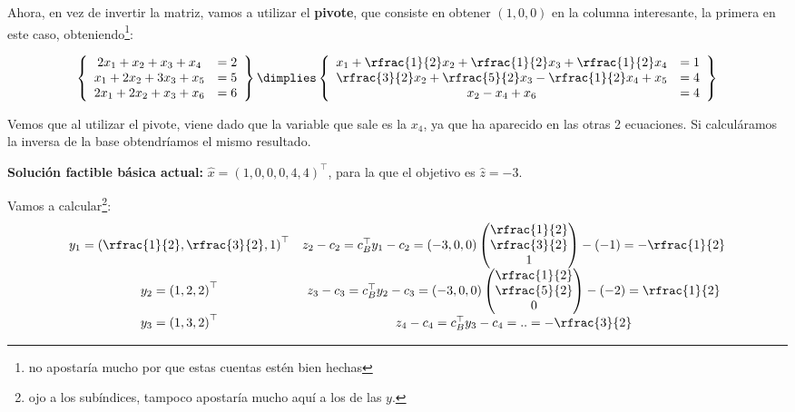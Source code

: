 \begin{example}
Ahora, en vez de invertir la matriz, vamos a utilizar el \textbf{pivote}, que consiste en obtener $(1,0,0)$ en la columna interesante, la primera en este caso, obteniendo\footnote{no apostaría mucho por que estas cuentas estén bien hechas}:

\[
\left\{
\begin{array}{cc}
2x_1+x_2+x_3 + x_4 &= 2   \\
x_1 + 2x_2 + 3x_3 +  x_5 &= 5  \\
2x_1+2x_2+x_3 + x_6 &= 6
\end{array}
\right\}
\dimplies
\left\{
\begin{array}{cc}
\displaystyle x_1+\rfrac{1}{2}x_2+\rfrac{1}{2}x_3 + \rfrac{1}{2}x_4 &= 1   \\
\displaystyle \rfrac{3}{2}x_2 + \rfrac{5}{2}x_3 - \rfrac{1}{2} x_4 + x_5 &= 4  \\
\displaystyle x_2 -x_4 + x_6 &= 4
\end{array}
\right\}
\]

Vemos que al utilizar el pivote, viene dado que la variable que sale es la $x_4$, ya que ha aparecido en las otras 2 ecuaciones. Si calculáramos la inversa de la base obtendríamos el mismo resultado.

\textbf{Solución factible básica actual:} $\hat{x}=(1,0,0,0,4,4)^\top$, para la que el objetivo es $\hat{z}=-3$.


Vamos a calcular\footnote{ojo a los subíndices, tampoco apostaría mucho aquí a los de las $y$.}:
\[
\begin{array}{cc}
	y_1 = \left(\rfrac{1}{2},\rfrac{3}{2},1\right)^\top
&
	z_2 - c_2 = c^\top_By_1 - c_2 = (-3,0,0)
		\begin{pmatrix}
			\rfrac{1}{2}\\\rfrac{3}{2}\\1
		\end{pmatrix} - (-1) = -\rfrac{1}{2}\\

	y_2 = \left(1,2,2\right)^\top
&
	z_3- c_3 = c^\top_By_2 - c_3 = (-3,0,0)
		\begin{pmatrix}
			\rfrac{1}{2}\\\rfrac{5}{2}\\0
		\end{pmatrix} - (-2) = \rfrac{1}{2}\\

	y_3 = \left(1,3,2\right)^\top
&
	z_4 - c_4 = c^\top_By_3 - c_4 = .. = -\rfrac{3}{2}
\end{array}
\]


\end{example}
